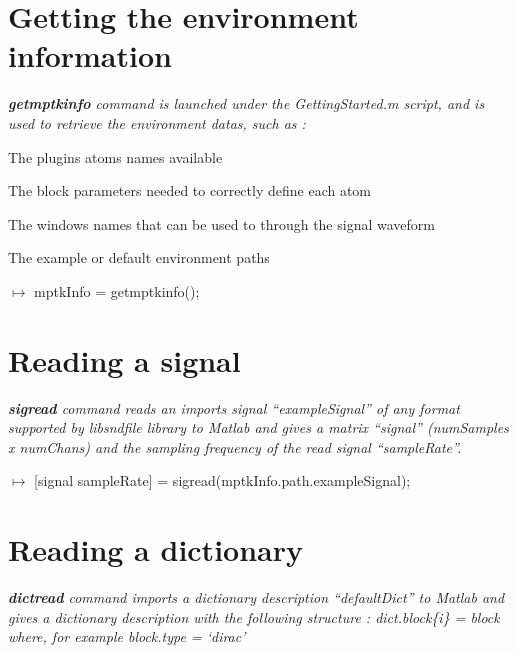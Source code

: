 \section{Getting the environment information}

\textcolor[rgb]{0.4,0.4,0.4}{\emph{\textbf{getmptkinfo} command is launched under the GettingStarted.m script, and is used to retrieve 
the environment datas, such as : }}

\begin{my_itemize}
	\item \textcolor[rgb]{0.4,0.4,0.4}{The plugins atoms names available}
	\item \textcolor[rgb]{0.4,0.4,0.4}{The block parameters needed to correctly define each atom}
	\item \textcolor[rgb]{0.4,0.4,0.4}{The windows names that can be used to through the signal waveform}
	\item \textcolor[rgb]{0.4,0.4,0.4}{The example or default environment paths}
\end{my_itemize}

\noindent $\mapsto$ mptkInfo = getmptkinfo();

\section{Reading a signal}

\textcolor[rgb]{0.4,0.4,0.4}{\emph{\textbf{sigread} command reads an imports signal ``exampleSignal'' of any format supported by  libsndfile library 
to Matlab and gives a matrix ``signal'' (numSamples x numChans) and the sampling frequency of the read signal ``sampleRate''.}}

\vspace{0.2 cm}

\noindent $\mapsto$ [signal sampleRate] = sigread(mptkInfo.path.exampleSignal);

\section{Reading a dictionary}

\textcolor[rgb]{0.4,0.4,0.4}{\emph{\textbf{dictread} command imports a dictionary description ``defaultDict'' to Matlab and gives a dictionary 
description with the following structure :
		dict.block\{i\} = block       where, for example
			block.type = `dirac'}}


